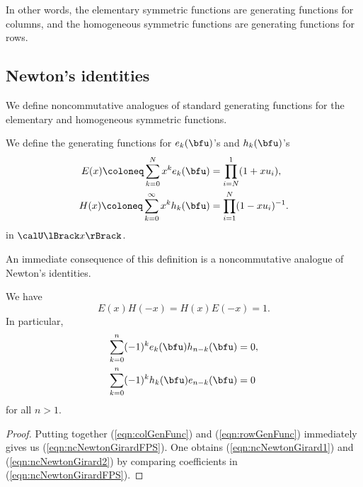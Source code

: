 \documentclass{article}
\begin{document}
In other words, the elementary symmetric functions are generating functions for columns, and the homogeneous symmetric functions are generating functions for rows.

\subsection{
    Newton's identities
}

We define noncommutative analogues of standard generating functions for the elementary and homogeneous symmetric functions.

\begin{definition}
    \label{def:rowcolGenFuncs}
    We define the generating functions for $e_k(\bfu)$'s and $h_k(\bfu)$'s
    \begin{align}
        \label{eqn:colGenFunc}
        E(x)
        \coloneq
        \sum_{k=0}^N
        x^k e_k(\bfu)
        &=
        \prod_{i=N}^1
        (1+xu_i),
        \\
        \label{eqn:rowGenFunc}
        H(x)
        \coloneq
        \sum_{k=0}^\infty
        x^k h_k(\bfu)
        &=
        \prod_{i=1}^N
        (1-xu_i)^{-1}.
    \end{align}
    in $\calU\lBrack x \rBrack$.
\end{definition}

An immediate consequence of this definition is a noncommutative analogue of Newton's identities.

\begin{proposition}
    We have
    \begin{equation}
        \label{eqn:ncNewtonGirardFPS}
        E(x)H(-x) = H(x)E(-x) = 1.
    \end{equation}
    In particular,
    \begin{align}
        \label{eqn:ncNewtonGirard1}
        \sum_{k=0}^n (-1)^ke_k(\bfu)h_{n-k}(\bfu) 
        &= 
        0, \\
        \label{eqn:ncNewtonGirard2}
        \sum_{k=0}^n (-1)^kh_k(\bfu)e_{n-k}(\bfu) 
        &= 
        0
    \end{align}
    for all $n > 1$.
\end{proposition}

\begin{proof}
    Putting together (\ref{eqn:colGenFunc}) and (\ref{eqn:rowGenFunc}) immediately gives us (\ref{eqn:ncNewtonGirardFPS}).
    One obtains (\ref{eqn:ncNewtonGirard1}) and (\ref{eqn:ncNewtonGirard2}) by comparing coefficients in (\ref{eqn:ncNewtonGirardFPS}).
\end{proof}
\end{document}
